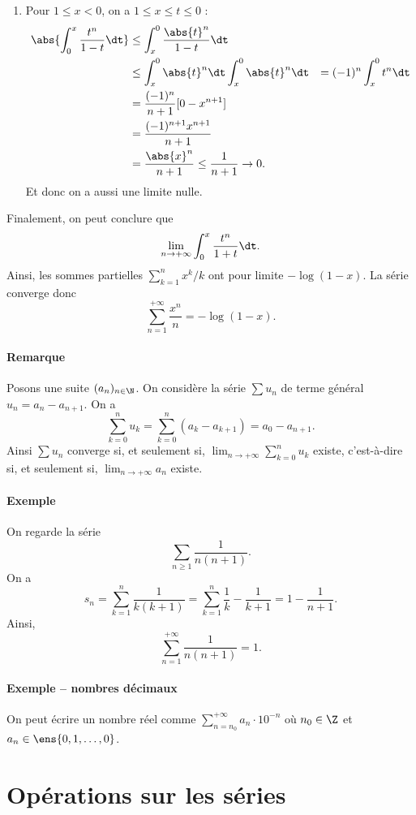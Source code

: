 \begin{itemize}
\begin{enumerate}
\item Pour $1\leq x < 0$, on a $1\leq x \leq t \leq 0$ :
\begin{align*}
\abs{\int_{0}^{x}\frac{t^{n}}{1-t}\dt} &\leq \int_{x}^{0}\frac{\abs{t}^{n}}{1-t}\dt \\
&\leq \int_{x}^{0}\abs{t}^{n}\dt 
\int_{x}^{0}\abs{t}^{n}\dt &= (-1)^{n}\int_{x}^{0}t^{n}\dt \\
&= \frac{(-1)^{n}}{n+1}[ 0 -x^{n+1}] \\
&= \frac{(-1)^{n+1}x^{n+1}}{n+1}\\
&= \frac{\abs{x}^{n}}{n+1} \leq \frac{1}{n+1}\to 0.
\end{align*}
Et donc on a aussi une limite nulle.
\end{enumerate}
Finalement, on peut conclure que \[\lim_{n\to +\infty} \int_{0}^{x}\frac{t^{n}}{1+t}\dt. \]Ainsi, les sommes partielles $\sum_{k=1}^{n}x^{k}/k$ ont pour limite $-\log(1-x)$. La série converge donc \[ \sum_{n=1}^{+\infty}\frac{x^{n}}{n} = -\log(1-x).\]
\end{itemize}

\paragraph{Remarque}Posons une suite $(a_n)_{n\in \N}$. On considère la série $\sum u_n$ de terme général $u_n = a_n - a_{n+1}$. On a \[ \sum_{k=0}^{n} u_k = \sum_{k=0}^{n}(a_k - a_{k+1}) = a_0 - a_{n+1}. \]Ainsi $\sum u_n$ converge si, et seulement si, $\lim_{n\to +\infty} \sum_{k=0}^{n}u_k$ existe, c'est-à-dire si, et seulement si, $\lim_{n\to +\infty} a_n$ existe.

\paragraph{Exemple}On regarde la série \[\sum_{n\geq 1}\frac{1}{n(n+1)}.\]On a \[ s_n = \sum_{k=1}^{n} \frac{1}{k(k+1)} = \sum_{k=1}^{n}\frac{1}{k}-\frac{1}{k+1} = 1 - \frac{1}{n+1}.\]Ainsi, \[ \sum_{n=1}^{+\infty}\frac{1}{n(n+1)} = 1.\]

\paragraph{Exemple -- nombres décimaux}On peut écrire un nombre réel comme $\sum_{n=n_0}^{+\infty}a_n\cdot 10^{-n}$ où $n_0\in \Z$ et $a_n \in \ens{0,1,\ldots,0}$.

\section{Opérations sur les séries}

